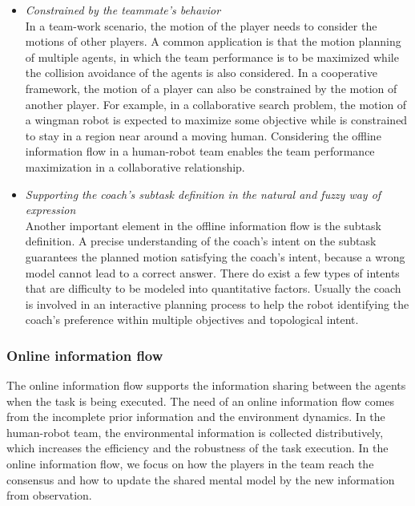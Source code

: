 \documentclass[phd]{byuprop}
\begin{document}
\begin{itemize}
\item {\em Constrained by the teammate's behavior} \\
In a team-work scenario, the motion of the player needs to consider the motions of other players.
A common application is that the motion planning of multiple agents, in which the team performance is to be maximized while the collision avoidance of the agents is also considered.
In a cooperative framework, the motion of a player can also be constrained by the motion of another player. 
For example, in a collaborative search problem, the motion of a wingman robot is expected to maximize some objective while is constrained to stay in a region near around a moving human.
Considering the offline information flow in a human-robot team enables the team performance maximization in a collaborative relationship.
	
\item {\em Supporting the coach's subtask definition in the natural and fuzzy way of expression} \\
Another important element in the offline information flow is the subtask definition.
A precise understanding of the coach's intent on the subtask guarantees the planned motion satisfying the coach's intent, because a wrong model cannot lead to a correct answer.
There do exist a few types of intents that are difficulty to be modeled into quantitative factors.
Usually the coach is involved in an interactive planning process to help the robot identifying the coach's preference within multiple objectives and topological intent.
\end{itemize}

\subsubsection{Online information flow}

The online information flow supports the information sharing between the agents when the task is being executed.
The need of an online information flow comes from the incomplete prior information and the environment dynamics.
In the human-robot team, the environmental information is collected distributively, which increases the efficiency and the robustness of the task execution.
In the online information flow, we focus on how the players in the team reach the consensus and how to update the shared mental model by the new information from observation.
\end{document}
